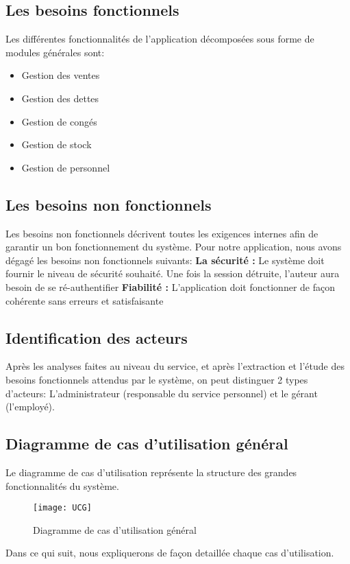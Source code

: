 \documentclass[a4paper,11pt]{article}
\begin{document}
\subsection{Les besoins fonctionnels}
Les différentes fonctionnalités de l'application décomposées sous forme de modules générales sont:
\begin{itemize}
  \item Gestion des ventes
  \item Gestion des dettes
  \item Gestion de congés
  \item Gestion de stock
  \item Gestion de personnel
\end{itemize}

\subsection{Les besoins non fonctionnels}
Les besoins non fonctionnels décrivent toutes les exigences internes afin de garantir un bon fonctionnement du système. Pour notre application, nous avons dégagé les besoins non fonctionnels suivants:
\newline
\newline \textbf{La sécurité :} Le système doit fournir le niveau de sécurité souhaité. Une fois la session détruite, l'auteur aura besoin de se ré-authentifier
\newline
\newline \textbf{Fiabilité :} L'application doit fonctionner de façon cohérente sans erreurs et satisfaisante

\subsection{Identification des acteurs}
Après les analyses faites au niveau du service, et après l’extraction et l’étude des besoins fonctionnels attendus par le système, on peut distinguer 2 types d’acteurs:
L'administrateur (responsable du service personnel) et le gérant (l'employé).

\subsection{Diagramme de cas d'utilisation général}
Le diagramme de cas d'utilisation représente la structure des grandes fonctionnalités du système.
\newline
\begin{figure}[ht]
\centering
\texttt{[image: UCG]}
\caption{Diagramme de cas d'utilisation général}
\end{figure}
\newline
\newline Dans ce qui suit, nous expliquerons de façon detaillée chaque cas d'utilisation.
\end{document}
